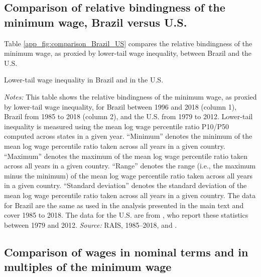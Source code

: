 \clearpage
\subsection{Comparison of relative bindingness of the minimum wage, Brazil versus U.S.\label{app_subsec:comparison_Brazil_US}}

Table \ref{app_fig:comparison_Brazil_US} compares the relative bindingness of the minimum wage, as proxied by lower-tail wage inequality, between Brazil and the U.S.

\begin{table}[!htb]
  \centering
  \caption{Lower-tail wage inequality in Brazil and in the U.S.\label{app_fig:comparison_Brazil_US}}
  \pretabvspace
  
  \posttabvspace
  \begin{minipage}[t]{1\columnwidth}%
    \begin{spacing}{0.75}
      \emph{\scriptsize{}Notes: }{\scriptsize{}This table shows the relative bindingness of the minimum wage, as proxied by lower-tail wage inequality, for Brazil between 1996 and 2018 (column 1), Brazil from 1985 to 2018 (column 2), and the U.S. from 1979 to 2012. Lower-tail inequality is measured using the mean log wage percentile ratio P10/P50 computed across states in a given year. ``Minimum'' denotes the minimum of the mean log wage percentile ratio taken across all years in a given country. ``Maximum'' denotes the maximum of the mean log wage percentile ratio taken across all years in a given country. ``Range'' denotes the range (i.e., the maximum minus the minimum) of the mean log wage percentile ratio taken across all years in a given country. ``Standard deviation'' denotes the standard deviation of the mean log wage percentile ratio taken across all years in a given country. The data for Brazil are the same as used in the analysis presented in the main text and cover 1985 to 2018. The data for the U.S. are from , who report these statistics between 1979 and 2012. %
      \emph{\scriptsize{}Source:} RAIS, 1985--2018, and .}
    \end{spacing}
  \end{minipage}
\end{table}




\clearpage
\subsection{Comparison of wages in nominal terms and in multiples of the minimum wage\label{app_subsec:comparison_nominal_multiples}}

